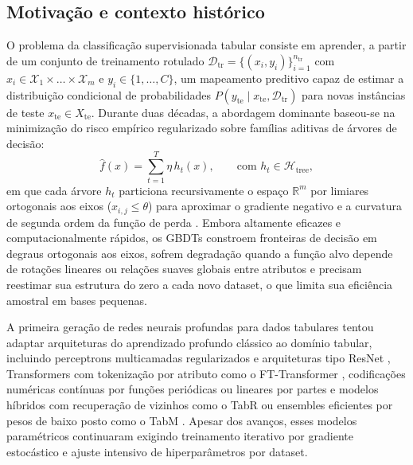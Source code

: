 \documentclass[11pt,a4paper]{article}
\begin{document}
\subsection{Motivação e contexto histórico}
\label{sec:motivacao}

O problema da classificação supervisionada tabular consiste em aprender, a partir de um conjunto de treinamento rotulado $\mathcal{D}_{\mathrm{tr}} = \{(x_i, y_i)\}_{i=1}^{n_{\mathrm{tr}}}$ com $x_i \in \mathcal{X}_1 \times \dots \times \mathcal{X}_m$ e $y_i \in \{1, \dots, C\}$, um mapeamento preditivo capaz de estimar a distribuição condicional de probabilidades $P(y_{\mathrm{te}} \mid x_{\mathrm{te}}, \mathcal{D}_{\mathrm{tr}})$ para novas instâncias de teste $x_{\mathrm{te}} \in X_{\mathrm{te}}$. Durante duas décadas, a abordagem dominante baseou-se na minimização do risco empírico regularizado sobre famílias aditivas de árvores de decisão:
\begin{equation}
    \hat{f}(x) = \sum_{t=1}^{T} \eta \, h_t(x), \qquad \text{com } h_t \in \mathcal{H}_{\text{tree}},
\end{equation}
em que cada árvore $h_t$ particiona recursivamente o espaço $\mathbb{R}^m$ por limiares ortogonais aos eixos ($x_{i,j} \le \theta$) para aproximar o gradiente negativo e a curvatura de segunda ordem da função de perda \cite{chen2016xgboost,ke2017lightgbm,prokhorenkova2018catboost}. Embora altamente eficazes e computacionalmente rápidos, os GBDTs constroem fronteiras de decisão em degraus ortogonais aos eixos, sofrem degradação quando a função alvo depende de rotações lineares ou relações suaves globais entre atributos e precisam reestimar sua estrutura do zero a cada novo dataset, o que limita sua eficiência amostral em bases pequenas.

A primeira geração de redes neurais profundas para dados tabulares tentou adaptar arquiteturas do aprendizado profundo clássico ao domínio tabular, incluindo perceptrons multicamadas regularizados e arquiteturas tipo ResNet \cite{gorishniy2021revisiting}, Transformers com tokenização por atributo como o FT-Transformer \cite{gorishniy2021revisiting}, codificações numéricas contínuas por funções periódicas ou lineares por partes \cite{gorishniy2022embeddings} e modelos híbridos com recuperação de vizinhos como o TabR \cite{gorishniy2024tabr} ou ensembles eficientes por pesos de baixo posto como o TabM \cite{gorishniy2025tabm}. Apesar dos avanços, esses modelos paramétricos continuaram exigindo treinamento iterativo por gradiente estocástico e ajuste intensivo de hiperparâmetros por dataset.
\end{document}
